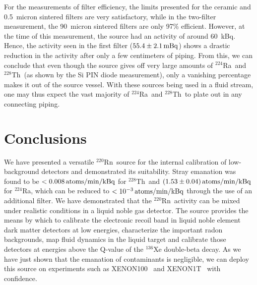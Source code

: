 For the measurements of filter efficiency, the limits presented for the ceramic and 0.5~micron sintered filters are very satisfactory, while in the two-filter measurement, the 90~micron sintered filters are only 97\% efficient. However, at the time of this measurement, the source had an activity of around 60~kBq. Hence, the activity seen in the first filter ($55.4\pm2.1\,\mathrm{mBq}$) shows a drastic reduction in the activity after only a few centimeters of piping. From this, we can conclude that even though the source gives off very large amounts of $^{224}$Ra~and $^{228}$Th~(as shown by the Si PIN diode measurement), only a vanishing percentage makes it out of the source vessel. With these sources being used in a fluid stream, one may thus expect the vast majority of $^{224}$Ra~and $^{228}$Th~to plate out in any connecting piping.

\section{Conclusions}

We have presented a versatile $^{220}$Rn~source for the internal calibration of low-background detectors and demonstrated its suitability. Stray emanation was found to be $<0.008\,\mathrm{atoms/min/kBq}$ for $^{228}$Th~and $(1.53\pm0.04)\,\mathrm{atoms/min/kBq}$ for $^{224}$Ra, which can be reduced to $<10^{-3}\,\mathrm{atoms/min/kBq}$ through the use of an additional filter. We have demonstrated that the $^{220}$Rn~activity can be mixed under realistic conditions in a liquid noble gas detector. The source provides the means by which to calibrate the electronic recoil band in liquid noble element dark matter detectors at low energies, characterize the important radon backgrounds, map fluid dynamics in the liquid target and calibrate those detectors at energies above the Q-value of the $^{136}$Xe double-beta decay. As we have just shown that the emanation of contaminants is negligible, we can deploy this source on experiments such as XENON100~\cite{Aprile:2016pmc} and XENON1T~\cite{Aprile:2017iyp} with confidence.